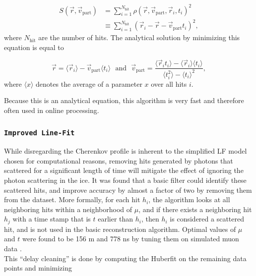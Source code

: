 \begin{equation}
\label{eq:lf}
\begin{split}
S(\vec{r},\vec{v}_{\textrm{part}}) &= \sum^{N_{\textrm{hit}}}_{i=1} \rho(\vec{r},\vec{v}_\textrm{part},\vec{r}_i,t_i)^2\\
&\equiv \sum^{N_{\textrm{hit}}}_{i=1} \left(\vec{r}_i - \vec{r} - \vec{v}_\textrm{part}t_i \right)^2,
\end{split}
\end{equation}
\noindent where $N_\textrm{hit}$ are the number of hits. The analytical solution by minimizing this equation is equal to

\begin{equation}
\vec{r} = \langle\vec{r}_i\rangle - \vec{v}_\textrm{part}\langle t_i\rangle \ \ \ \textrm{and}\ \ \ \vec{v}_\textrm{part} = \frac{\langle \vec{r}_i t_i\rangle - \langle \vec{r}_i \rangle \langle t_i \rangle }{\langle t_i^2 \rangle - \langle t_i \rangle^2},
\end{equation}
\noindent where $\langle x \rangle$ denotes the average of a parameter $x$ over all hits $i$.

Because this is an analytical equation, this algorithm is very fast and therefore often used in online processing.
 
\subsubsection{\texttt{Improved Line-Fit}}
While disregarding the Cherenkov profile is inherent to the simplified LF model chosen for computational reasons, removing hits generated by photons that scattered for a significant length of time will mitigate the effect of ignoring the photon scattering in the ice. It was found that a basic filter could identify these scattered hits, and improve accuracy by almost a factor of two by removing them from the dataset. More formally, for each hit $h_i$, the algorithm looks at all neighboring hits within a neighborhood of $\mu$, and if there exists a neighboring hit $h_j$ with a time stamp that is $t$ earlier than $h_i$, then $h_i$ is considered a scattered hit, and is not used in the basic reconstruction algorithm. Optimal values of $\mu$ and $t$ were found to be 156 m and 778 ns by tuning them on simulated muon data \cite{Aartsen:2013bfa}.\\

\noindent This ``delay cleaning'' is done by computing the Huberfit on the remaining data points and minimizing

